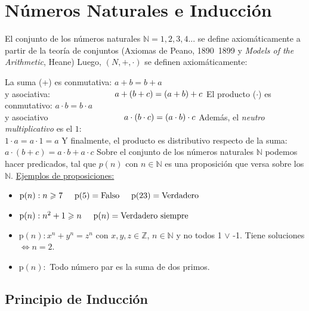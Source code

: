 \documentclass[../main.tex]{subfiles}
\begin{document}
    \section{Números Naturales e Inducción}
{
\cite{sasyk} El conjunto de los números naturales $\mathbb{N} = {1,2,3,4 ...}$ se define axiomáticamente a partir de la teoría de conjuntos (Axiomas de Peano, 1890~1899 y \textit{Models of the Arithmetic}, Heane)
\nln
Luego, $(N, +, \cdot )$ se definen axiomáticamente:
\nln

La suma (+) es conmutativa: $a+b = b+a$ \\
y asociativa: $\hspace{26mm} a+(b+c)=(a+b)+c$
\nln
El producto ($\cdot$) es conmutativo: $a \cdot b = b \cdot a$ \\
y asociativo $\hspace{30.7mm} a \cdot (b \cdot c)=(a \cdot b) \cdot c$
\nln
Además, el \textit{neutro multiplicativo} es el $1$:\\
$1 \cdot a = a \cdot 1 = a$
\nln
Y finalmente, el producto es distributivo respecto de la suma:\\
$a \cdot (b+c) = a \cdot b + a \cdot c$
\nln 
Sobre el conjunto de los números naturales $\mathbb{N}$ podemos hacer predicados, tal que $p(n)$ con $n \in \mathbb{N}$ es una proposición que versa sobre los $\mathbb{N}$.
\nln
\ul{Ejemplos de proposiciones:}

\begin{itemize}
    \item $\text{p}(n) : n \geqslant 7 \hspace{5mm} \text{p}(5) = \text{Falso}  \hspace{5mm}  \text{p}(23) = \text{Verdadero}$
    \item $\text{p}(n): n^2 + 1 \geqslant n \hspace{5mm} \text{p}(n) = \text{Verdadero siempre}$
    \item $\text{p}(n): x^n + y^n = z^n$ con $x,y,z \in \mathbb{Z}$, $n \in \mathbb{N}$ y no todos 1 $\lor$ -1. Tiene soluciones $\iff n = 2$. 
    \item $\text{p}(n): $ Todo número par es la suma de dos primos.
\end{itemize}

\newpage
}

\subsection{Principio de Inducción}
\end{document}
